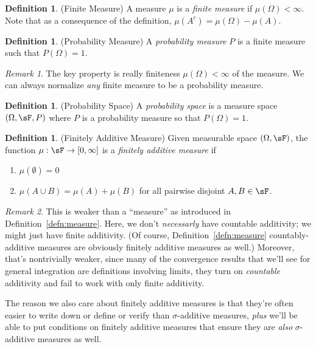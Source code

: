 \documentclass[12pt]{article}
\theoremstyle{plain}
\theoremstyle{definition}
\newtheorem{defn}[thm]{Definition}
\theoremstyle{remark}
\newtheorem*{rmk}{Remark}
\newcommand{\ra}{\rightarrow}
\begin{document}
\begin{defn}(Finite Measure)
A measure $\mu$ is a \emph{finite measure} if $\mu(\Omega)<\infty$.
Note that as a consequence of the definition,
$\mu(A^c) = \mu(\Omega) - \mu(A)$.
\end{defn}

\begin{defn}(Probability Measure)
A \emph{probability measure} $P$ is a finite measure such that
$P(\Omega)=1$.
\end{defn}
\begin{rmk}
The key property is really finiteness $\mu(\Omega)<\infty$ of the
measure. We can always normalize \emph{any} finite measure to be a
probability measure.
\end{rmk}

\begin{defn}(Probability Space)
A \emph{probability space} is a measure space $(\Omega,\sF,P)$ where $P$
is a probability measure so that $P(\Omega)=1$.
\end{defn}

\clearpage
\begin{defn}(Finitely Additive Measure)
Given measurable space $(\Omega,\sF)$, the function
$\mu:\sF\ra [0,\infty]$ is a \emph{finitely additive measure} if
\begin{enumerate}
  \item $\mu(\emptyset)=0$
  \item $\mu(A\cup B) = \mu(A) + \mu(B)$ for all pairwise disjoint
    $A,B\in\sF$.
\end{enumerate}
\end{defn}
\begin{rmk}
This is weaker than a ``measure'' as introduced in
Definition~\ref{defn:measure}. Here, we don't \emph{necessarly} have
countable additivity; we might just have finite additivity.  (Of course,
Definition~\ref{defn:measure}  countably-additive measures are obviously
finitely additive measures as well.) Moreover, that's nontrivially
weaker, since many of the convergence results that we'll see for general
integration are definitions involving limits, they turn on
\emph{countable} additivity and fail to work with
only finite additivity.

The reason we also care about finitely additive measures is that they're
often easier to write down or define or verify than $\sigma$-additive
measures, \emph{plus} we'll be able to put conditions on finitely
additive measures that ensure they are \emph{also} $\sigma$-additive
measures as well.
\end{rmk}
\end{document}
